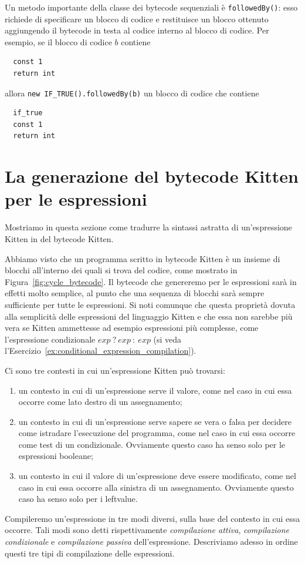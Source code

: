 Un metodo importante della classe dei bytecode sequenziali \`e
\texttt{followedBy()}: esso richiede di specificare un blocco di codice
e restituisce un blocco ottenuto aggiungendo il bytecode in testa
al codice interno al blocco di codice. Per esempio, se il blocco di
codice $b$ contiene
%
\begin{verbatim}
  const 1
  return int
\end{verbatim}
%
allora \texttt{new IF\_TRUE().followedBy(b)} \e un blocco di codice che
contiene
%
\begin{verbatim}
  if_true
  const 1
  return int
\end{verbatim}
%
\section{La generazione del bytecode Kitten per le espressioni}
  \label{sec:expressions_bytecode_generation}
%
Mostriamo in questa sezione come tradurre
la sintassi astratta di un'espressione Kitten in del bytecode Kitten.

Abbiamo visto che un programma scritto in bytecode Kitten \`e un insieme
di blocchi all'interno dei quali si trova del codice,
come mostrato in Figura~\ref{fig:cycle_bytecode}.
Il bytecode che genereremo per le espressioni sar\`a in effetti molto
semplice, al punto che una sequenza di blocchi sar\`a
sempre sufficiente per tutte le espressioni. Si noti comunque che questa
propriet\`a
\e dovuta alla semplicit\`a delle espressioni del linguaggio Kitten e
che essa non sarebbe pi\`u vera se Kitten ammettesse ad esempio espressioni pi\`u
complesse, come l'espressione condizionale
$\mathit{exp}\ \mathtt{?}\ \mathit{exp}\ \mathtt{:}\ \mathit{exp}$
(si veda l'Esercizio~\ref{ex:conditional_expression_compilation}).

Ci sono tre contesti in cui un'espressione Kitten pu\`o trovarsi:
%
\begin{enumerate}
\item un contesto in cui di un'espressione serve il valore, come
      nel caso in cui essa occorre come lato destro di un assegnamento;
\item un contesto in cui di un'espressione serve sapere se \e vera o falsa
      per decidere come istradare l'esecuzione del programma, come nel
      caso in cui essa occorre come test di un condizionale. Ovviamente
      questo caso ha senso solo per le espressioni booleane;
\item un contesto in cui il valore di un'espressione deve essere modificato,
      come nel caso in cui essa occorre alla sinistra di un assegnamento.
      Ovviamente questo caso ha senso solo per i leftvalue.
\end{enumerate}
%
Compileremo un'espressione in tre modi diversi,
sulla base del contesto in cui essa occorre. Tali modi
sono detti rispettivamente
\emph{compilazione attiva}, \emph{compilazione condizionale} e
\emph{compilazione passiva} dell'espressione. Descriviamo adesso in
ordine questi tre tipi di compilazione delle espressioni.
%

